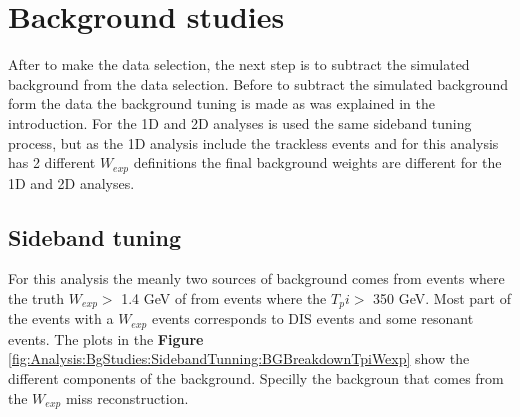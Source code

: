 \pagebreak



\section{Background studies}
\label{Cap:Analysis:BgStudies}
After to make the data selection, the next step is to subtract the simulated background from the data selection. Before to subtract the simulated background form the data the background tuning is made as was explained in the introduction. For the 1D and 2D analyses is used the same sideband tuning process, but as the 1D analysis include the trackless events and for this analysis has 2 different $W_{exp}$ definitions the final background weights are different for the 1D and 2D analyses. 





\subsection{Sideband tuning}
\label{Cap:Analysis:BgStudies:SidebandTuning}
For this analysis the meanly two sources of background comes from events where the truth $W_{exp} >$ 1.4 GeV  of from events where the $T_pi > $ 350 GeV. Most part of the events with a $W_{exp}$ events corresponds to DIS events and some resonant events. The plots in the \textbf{Figure} \ref{fig:Analysis:BgStudies:SidebandTunning:BGBreakdownTpiWexp} show the different components of the background. Specilly the backgroun that comes from the $W_{exp}$ miss reconstruction. 

